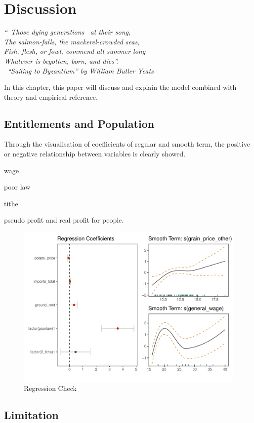 \chapter{Discussion}

\textit{``\textendash\ Those dying generations \textendash\ at their song,\\
The salmon-falls, the mackerel-crowded seas,\\
Fish, flesh, or fowl, commend all summer long\\
Whatever is begotten, born, and dies''.\\
\textemdash\ ``Sailing to Byzantium'' by William Butler Yeats }

\vspace{.2cm}

In this chapter, this paper will discuss and explain the model combined with theory and empirical reference.

\section{Entitlements and Population}

Through the visualisation of coefficients of regular and smooth term, the positive or negative relationship between variables is clearly showed.

wage

poor law

tithe

pseudo profit and real profit for people.

\begin{figure}[h]
    \centering
    \caption{Regression Check}
    \includegraphics[width=.9\textwidth]{../03_outputs/coef.visual.pdf}
\end{figure}
\vspace{-7pt}

\section{Limitation}




